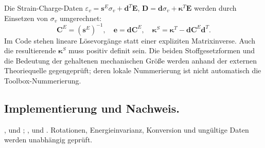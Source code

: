 Die Strain-Charge-Daten
$\varepsilon_v=\mathbf s^E\sigma_v+\mathbf d^T\mathbf E$,
$\mathbf D=\mathbf d\sigma_v+\boldsymbol\kappa^T\mathbf E$ werden durch
Einsetzen von $\sigma_v$ umgerechnet:
\begin{equation}\label{eq:conversion}
\mathbf C^E=(\mathbf s^E)^{-1},\quad
\mathbf e=\mathbf d\mathbf C^E,\quad
\boldsymbol\kappa^S=\boldsymbol\kappa^T-\mathbf d\mathbf C^E\mathbf d^T.
\end{equation}
Im Code stehen lineare Lösevorgänge statt einer expliziten Matrixinverse.
Auch die resultierende $\boldsymbol\kappa^S$ muss positiv definit sein.
Die beiden Stoffgesetzformen und die Bedeutung der gehaltenen mechanischen
Größe werden anhand der externen Theoriequelle \cite{comsol-piezo} gegengeprüft;
deren lokale Nummerierung ist nicht automatisch die Toolbox-Nummerierung.

\subsection*{Implementierung und Nachweis.}
{\small\raggedright
{},
 und
;
,
 und
. Rotationen, Energieinvarianz,
Konversion und ungültige Daten werden unabhängig geprüft.

\par}
